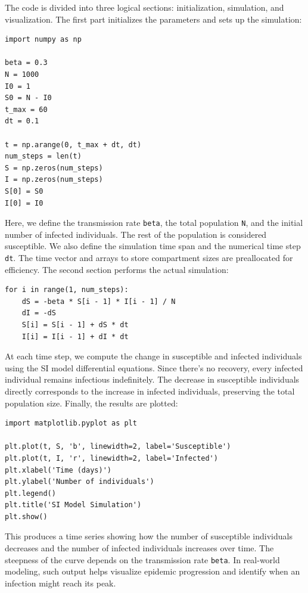 \documentclass{article}
\begin{document}
The code is divided into three logical sections: initialization, simulation, and visualization. The first part initializes the parameters and sets up the simulation:

\begin{lstlisting}[caption={Initiation}]
import numpy as np

beta = 0.3
N = 1000
I0 = 1
S0 = N - I0
t_max = 60
dt = 0.1

t = np.arange(0, t_max + dt, dt)
num_steps = len(t)
S = np.zeros(num_steps)
I = np.zeros(num_steps)
S[0] = S0
I[0] = I0
\end{lstlisting}

Here, we define the transmission rate \texttt{beta}, the total population \texttt{N}, and the initial number of infected individuals. The rest of the population is considered susceptible. We also define the simulation time span and the numerical time step \texttt{dt}. The time vector and arrays to store compartment sizes are preallocated for efficiency. The second section performs the actual simulation:
\begin{lstlisting}[caption={Simulation loop}]
for i in range(1, num_steps):
    dS = -beta * S[i - 1] * I[i - 1] / N
    dI = -dS
    S[i] = S[i - 1] + dS * dt
    I[i] = I[i - 1] + dI * dt
\end{lstlisting}
At each time step, we compute the change in susceptible and infected individuals using the SI model differential equations. Since there's no recovery, every infected individual remains infectious indefinitely. The decrease in susceptible individuals directly corresponds to the increase in infected individuals, preserving the total population size. Finally, the results are plotted:

\begin{lstlisting}[caption={Plotting}]
import matplotlib.pyplot as plt

plt.plot(t, S, 'b', linewidth=2, label='Susceptible')
plt.plot(t, I, 'r', linewidth=2, label='Infected')
plt.xlabel('Time (days)')
plt.ylabel('Number of individuals')
plt.legend()
plt.title('SI Model Simulation')
plt.show()
\end{lstlisting}
This produces a time series showing how the number of susceptible individuals decreases and the number of infected individuals increases over time. The steepness of the curve depends on the transmission rate \texttt{beta}. In real-world modeling, such output helps visualize epidemic progression and identify when an infection might reach its peak.
\end{document}
